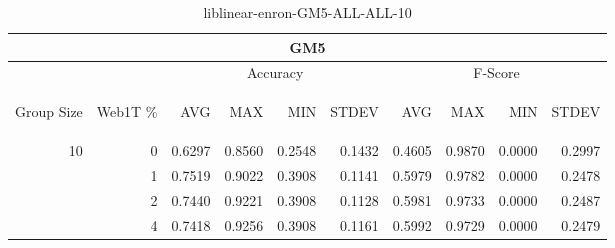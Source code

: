 \begin{center}
\begin{table}[htbp]
\begin{tabular}{ | r | r | r | r | r | r | r | r | r | r |}
\hline
\multicolumn{10}{|c|}{GM5}\\
\hline
 & & \multicolumn{4}{|c|}{Accuracy} & \multicolumn{4}{|c|}{F-Score}\\ \cline{3-10}
\begin{sideways}Group Size\end{sideways} & \begin{sideways}Web1T \%\end{sideways} & \begin{sideways}AVG\end{sideways} & \begin{sideways}MAX\end{sideways} & \begin{sideways}MIN\end{sideways} & \begin{sideways}STDEV\end{sideways} & \begin{sideways}AVG\end{sideways} & \begin{sideways}MAX\end{sideways} & \begin{sideways}MIN\end{sideways} & \begin{sideways}STDEV\end{sideways}\\
\hline
\multirow{3}{*}{10}
 & 0 & 0.6297 & 0.8560 & 0.2548 & 0.1432 & 0.4605 & 0.9870 & 0.0000 & 0.2997\\ \cline{2-10}
 & 1 & 0.7519 & 0.9022 & 0.3908 & 0.1141 & 0.5979 & 0.9782 & 0.0000 & 0.2478\\ \cline{2-10}
 & 2 & 0.7440 & 0.9221 & 0.3908 & 0.1128 & 0.5981 & 0.9733 & 0.0000 & 0.2487\\ \cline{2-10}
 & 4 & 0.7418 & 0.9256 & 0.3908 & 0.1161 & 0.5992 & 0.9729 & 0.0000 & 0.2479\\ \cline{2-10}
\hline
\end{tabular}
\caption{liblinear-enron-GM5-ALL-ALL-10}
\label{table:liblinear-enron-GM5-ALL-ALL-10}
\end{table}
\end{center}

